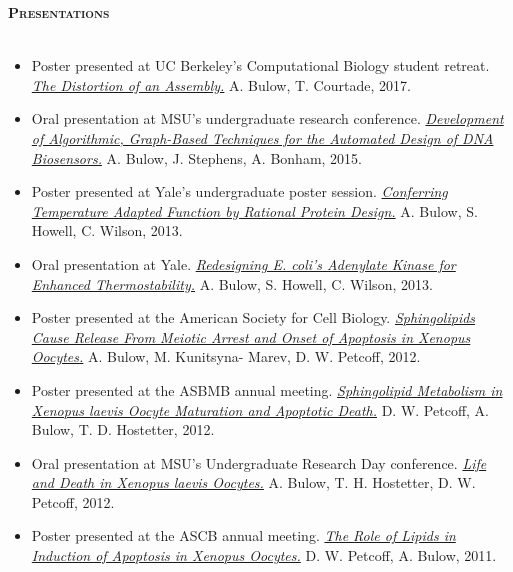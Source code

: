 \documentclass{article}
\newcommand{\lineunder}{\vspace*{-8pt} \\ \hspace*{-18pt} \hrulefill \\}
\newcommand{\header}[1]{{\vspace*{8pt}\hspace*{-16pt} \textsc{\textbf{\large{#1}}}} \vspace*{4pt} \lineunder \vspace*{4pt}}
\begin{document}
\header{Presentations}
\begin{itemize}
    \item Poster presented at UC Berkeley’s Computational Biology student retreat. \href{https://drive.google.com/file/d/1KP7PMcwjiTxELFN4eLtC5HGHk9OF8_WL/view?usp=sharing}{\emph{The Distortion of an Assembly.}} A. Bulow, T. Courtade, 2017.
    
    \item Oral presentation at MSU's undergraduate research conference. \href{https://drive.google.com/open?id=1Qp-pwFFNq9W6Y1yXco7bPYb9gR42gzD2}{\emph{Development of Algorithmic, Graph-Based Techniques for the Automated Design of DNA Biosensors.}} A. Bulow, J. Stephens, A. Bonham, 2015.
    
    \item Poster presented at Yale's undergraduate poster session. \href{https://drive.google.com/open?id=1Nw7wZhaQDygO1d3IZz-vhO8EmXwR53my}{\emph{Conferring Temperature Adapted Function by Rational Protein Design.}} A. Bulow, S. Howell, C. Wilson, 2013.
    
    \item Oral presentation at Yale. \href{https://drive.google.com/open?id=1sF4QX-CQlN3W_EaFlgoVAvbmasgJ1z5q}{\emph{Redesigning E. coli's Adenylate Kinase for Enhanced Thermostability.}} A. Bulow, S. Howell, C. Wilson, 2013.
    
    \item Poster presented at the American Society for Cell Biology. \href{https://drive.google.com/open?id=1Vq4hbrAPjBWLphlA4Se0KVR6hjOEQe-S}{\emph{Sphingolipids Cause Release From Meiotic Arrest and Onset of Apoptosis in Xenopus Oocytes.}} A. Bulow, M. Kunitsyna-	Marev, D. W. Petcoff, 2012.
    
    \item Poster presented at the ASBMB annual meeting. \href{https://drive.google.com/open?id=13EF6xDcyMrBdnJIrP-nvODf55aXsTH6-}{\emph{Sphingolipid Metabolism in Xenopus laevis Oocyte Maturation and Apoptotic Death.}} D. W. Petcoff, A. Bulow, T. D. Hostetter, 2012.
    
    \item Oral presentation at MSU's Undergraduate Research Day conference. \href{https://drive.google.com/open?id=1ln5oxNm-i0YR0fhrTjiymTV8P7ksthtm}{\emph{Life and Death in Xenopus laevis Oocytes.}} A. Bulow, T. H. Hostetter, D. W. Petcoff, 2012.
    
    \item Poster presented at the ASCB annual meeting. \href{https://drive.google.com/open?id=1WiOZdf3LeyTG-4txPeANV7zDjhcjQIQ5}{\emph{The Role of Lipids in Induction of Apoptosis in Xenopus Oocytes.}} D. W. Petcoff, A. Bulow, 2011.
    

\end{itemize}
\end{document}
